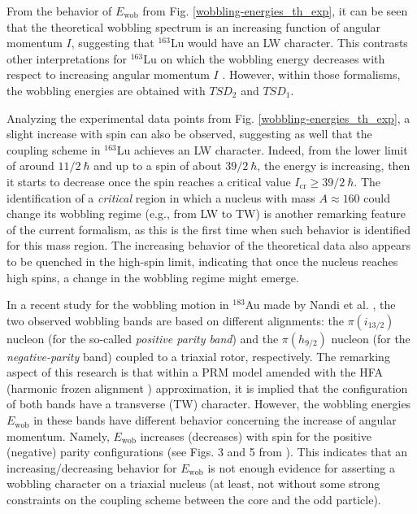 \documentclass[myclassdoc,debug]{rjparticle}
\begin{document}
From the behavior of $E_\text{wob}$ from Fig. \ref{wobbling-energies_th_exp}, it can be seen that the theoretical wobbling spectrum is an increasing function of angular momentum $I$, suggesting that $^{163}$Lu would have an LW character. This contrasts other interpretations for $^{163}$Lu on which the wobbling energy decreases with respect to increasing angular momentum $I$  \cite{frauendorf2014transverse,frauendorf2018comment, tanabe2018reply}. However, within those formalisms, the wobbling energies are obtained with $TSD_2$ and $TSD_1$.

Analyzing the experimental data points from Fig. \ref{wobbling-energies_th_exp}, a slight increase with spin can also be observed, suggesting as well that the coupling scheme in $^{163}$Lu achieves an LW character. Indeed, from the lower limit of around $11/2\ \hbar$ and up to a spin of about $39/2\ \hbar$, the energy is increasing, then it starts to decrease once the spin reaches a critical value $I_\text{cr}\geq39/2\ \hbar$. The identification of a \emph{critical} region in which a nucleus with mass $A\approx160$ could change its wobbling regime (e.g., from LW to TW) is another remarking feature of the current formalism, as this is the first time when such behavior is identified for this mass region. The increasing behavior of the theoretical data also appears to be quenched in the high-spin limit, indicating that once the nucleus reaches high spins, a change in the wobbling regime might emerge.

In a recent study for the wobbling motion in $^{183}$Au made by Nandi et al. \cite{nandi2020first}, the two observed wobbling bands are based on different alignments: the $\pi(i_{13/2})$ nucleon (for the so-called \emph{positive parity band}) and the $\pi(h_{9/2})$ nucleon (for the \emph{negative-parity} band) coupled to a triaxial rotor, respectively. The remarking aspect of this research is that within a PRM model amended with the HFA (harmonic frozen alignment \cite{frauendorf2014transverse}) approximation, it is implied that the configuration of both bands have a transverse (TW) character. However, the wobbling energies $E_\text{wob}$ in these bands have different behavior concerning the increase of angular momentum. Namely, $E_\text{wob}$ increases (decreases) with spin for the positive (negative) parity configurations (see Figs. 3 and 5 from \cite{nandi2020first}). This indicates that an increasing/decreasing behavior for $E_\text{wob}$ is not enough evidence for asserting a wobbling character on a triaxial nucleus (at least, not without some strong constraints on the coupling scheme between the core and the odd particle).
\end{document}
